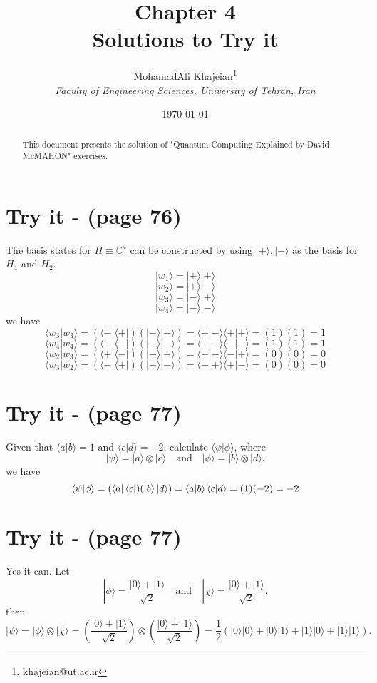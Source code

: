 \documentclass[12pt]{article}
\title{\textbf{Chapter 4} \\ \small Solutions to Try it}
\author{
    MohamadAli Khajeian\footnote{khajeian@ut.ac.ir} \\ 
    \small \textit{Faculty of Engineering Sciences, University of Tehran, Iran} \\ 
}
\date{\today}
\begin{document}
\maketitle

\begin{abstract}
    This document presents the solution of "Quantum Computing Explained by David McMAHON" exercises.
\end{abstract}

\section*{Try it - (page 76)}
The basis states for \( H \equiv \mathbb{C}^4 \) can be constructed by using \( |+\rangle, |-\rangle \) as the basis for \( H_1 \) and \( H_2 \).
\begin{equation*}
|w_1\rangle = |+\rangle|+\rangle
\end{equation*}
\begin{equation*}
|w_2\rangle = |+\rangle|-\rangle
\end{equation*}
\begin{equation*}
|w_3\rangle = |-\rangle|+\rangle 
\end{equation*}
\begin{equation*}
|w_4\rangle = |-\rangle|-\rangle
\end{equation*}
we have
\[
\langle w_3 | w_3 \rangle = (\langle -| \langle +|)(|- \rangle |+ \rangle) = \langle -|- \rangle \langle +|+ \rangle = (1)(1) = 1
\]
\[
\langle w_4 | w_4 \rangle = (\langle -| \langle -|)(|- \rangle |-\rangle) = \langle -|- \rangle \langle -|-\rangle = (1)(1) = 1
\]
\[
\langle w_2 | w_3 \rangle = (\langle +| \langle -|)(|- \rangle |+\rangle) = \langle +|- \rangle \langle -|+\rangle = (0)(0) = 0
\]
\[
\langle w_3 | w_2 \rangle = (\langle -| \langle +|)(|+ \rangle |- \rangle) = \langle -|+ \rangle \langle +|- \rangle = (0)(0) = 0
\]
\section*{Try it - (page 77)}
Given that \( \langle a | b \rangle = 1 \) and \( \langle c | d \rangle = -2 \), calculate \( \langle \psi | \phi \rangle \), where
\[
|\psi\rangle = |a\rangle \otimes |c\rangle \quad \text{and} \quad |\phi\rangle = |b\rangle \otimes |d\rangle.
\]
we have
\[
\braket{\psi | \phi} = (\bra{a} \bra{c})(\ket{b} \ket{d}) = \braket{a | b} \braket{c | d} = (1)(-2) = -2
\]
\section*{Try it - (page 77)}
Yes it can. Let
\[
|\phi\rangle = \frac{|0\rangle + |1\rangle}{\sqrt{2}} \quad \text{and} \quad |\chi\rangle = \frac{|0\rangle + |1\rangle}{\sqrt{2}}.
\]
then
\[
|\psi\rangle = |\phi\rangle \otimes |\chi\rangle = \left( \frac{|0\rangle + |1\rangle}{\sqrt{2}} \right) \otimes \left( \frac{|0\rangle + |1\rangle}{\sqrt{2}} \right) = \frac{1}{2} (|0\rangle |0\rangle + |0\rangle |1\rangle + |1\rangle |0\rangle + |1\rangle |1\rangle).
\]
\end{document}
